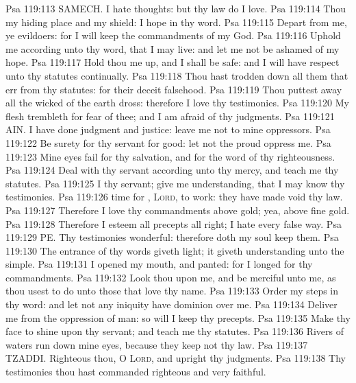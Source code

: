 \vs Psa 119:113 SAMECH. I hate  thoughts: but thy law do I love.
\vs Psa 119:114 Thou  my hiding place and my shield: I hope in thy word.
\vs Psa 119:115 Depart from me, ye evildoers: for I will keep the commandments of my God.
\vs Psa 119:116 Uphold me according unto thy word, that I may live: and let me not be ashamed of my hope.
\vs Psa 119:117 Hold thou me up, and I shall be safe: and I will have respect unto thy statutes continually.
\vs Psa 119:118 Thou hast trodden down all them that err from thy statutes: for their deceit  falsehood.
\vs Psa 119:119 Thou puttest away all the wicked of the earth  dross: therefore I love thy testimonies.
\vs Psa 119:120 My flesh trembleth for fear of thee; and I am afraid of thy judgments.
\vs Psa 119:121 AIN. I have done judgment and justice: leave me not to mine oppressors.
\vs Psa 119:122 Be surety for thy servant for good: let not the proud oppress me.
\vs Psa 119:123 Mine eyes fail for thy salvation, and for the word of thy righteousness.
\vs Psa 119:124 Deal with thy servant according unto thy mercy, and teach me thy statutes.
\vs Psa 119:125 I  thy servant; give me understanding, that I may know thy testimonies.
\vs Psa 119:126  time for , \textsc{Lord}, to work:  they have made void thy law.
\vs Psa 119:127 Therefore I love thy commandments above gold; yea, above fine gold.
\vs Psa 119:128 Therefore I esteem all  precepts  all  right;  I hate every false way.
\vs Psa 119:129 PE. Thy testimonies  wonderful: therefore doth my soul keep them.
\vs Psa 119:130 The entrance of thy words giveth light; it giveth understanding unto the simple.
\vs Psa 119:131 I opened my mouth, and panted: for I longed for thy commandments.
\vs Psa 119:132 Look thou upon me, and be merciful unto me, as thou usest to do unto those that love thy name.
\vs Psa 119:133 Order my steps in thy word: and let not any iniquity have dominion over me.
\vs Psa 119:134 Deliver me from the oppression of man: so will I keep thy precepts.
\vs Psa 119:135 Make thy face to shine upon thy servant; and teach me thy statutes.
\vs Psa 119:136 Rivers of waters run down mine eyes, because they keep not thy law.
\vs Psa 119:137 TZADDI. Righteous  thou, O \textsc{Lord}, and upright  thy judgments.
\vs Psa 119:138 Thy testimonies  thou hast commanded  righteous and very faithful.
